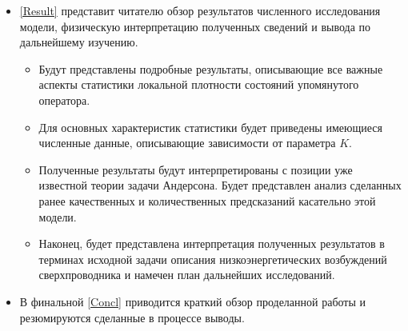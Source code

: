\begin{itemize}
	\item \autoref{Result} представит читателю обзор результатов численного исследования модели, физическую интерпретацию полученных сведений и вывода по дальнейшему изучению.
	\begin{itemize}
		\item Будут представлены подробные результаты, описывающие все важные аспекты статистики локальной плотности состояний упомянутого оператора. 
		\item Для основных характеристик статистики будет приведены имеющиеся численные данные, описывающие зависимости от параметра $K$.
		\item Полученные результаты будут интерпретированы с позиции уже известной теории задачи Андерсона. Будет представлен анализ сделанных ранее качественных и количественных предсказаний касательно этой модели.
		\item Наконец, будет представлена интерпретация полученных результатов в терминах исходной задачи описания низкоэнергетических возбуждений сверхпроводника и намечен план дальнейших исследований.
	\end{itemize}

	\item В финальной \autoref{Concl} приводится краткий обзор проделанной работы и резюмируются сделанные в процессе выводы.
\end{itemize}
